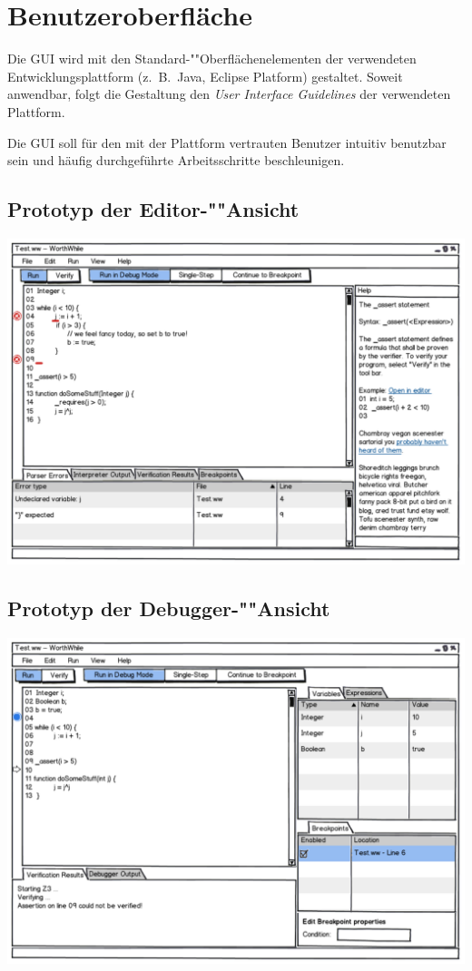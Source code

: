 \section{Benutzeroberfläche}%

Die GUI wird mit den Standard-""Oberflächenelementen der verwendeten Entwicklungsplattform (z.~B.\ Java, Eclipse Platform) gestaltet. Soweit anwendbar, folgt die Gestaltung den \emph{User Interface Guidelines} der verwendeten Plattform.

Die GUI soll für den mit der Plattform vertrauten Benutzer intuitiv benutzbar sein und häufig durchgeführte Arbeitsschritte beschleunigen.

\subsection{Prototyp der Editor-""Ansicht}%

\includegraphics[width=\textwidth]{mockup/editor.pdf}

\subsection{Prototyp der Debugger-""Ansicht}%

\includegraphics[width=\textwidth]{mockup/debug.pdf}
